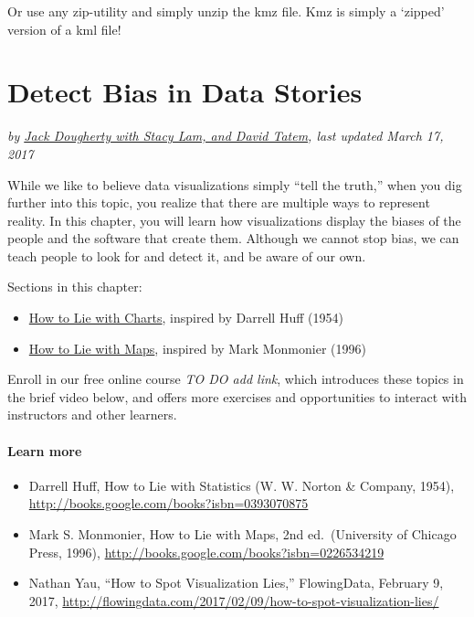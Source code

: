 \documentclass[
  english,
]{book}
\providecommand{\tightlist}{%
  \setlength{\itemsep}{0pt}\setlength{\parskip}{0pt}}
\begin{document}
Or use any zip-utility and simply unzip the kmz file. Kmz is simply a `zipped' version of a kml file!

\hypertarget{detect}{%
\chapter{Detect Bias in Data Stories}\label{detect}}

\emph{by \href{authors}{Jack Dougherty with Stacy Lam, and David Tatem}, last updated March 17, 2017}

While we like to believe data visualizations simply ``tell the truth,'' when you dig further into this topic, you realize that there are multiple ways to represent reality. In this chapter, you will learn how visualizations display the biases of the people and the software that create them. Although we cannot stop bias, we can teach people to look for and detect it, and be aware of our own.

Sections in this chapter:

\begin{itemize}
\tightlist
\item
  \href{how-to-lie-with-charts}{How to Lie with Charts}, inspired by Darrell Huff (1954)
\item
  \href{how-to-lie-with-maps}{How to Lie with Maps}, inspired by Mark Monmonier (1996)
\end{itemize}

Enroll in our free online course \emph{TO DO add link}, which introduces these topics in the brief video below, and offers more exercises and opportunities to interact with instructors and other learners.

\hypertarget{learn-more-19}{%
\subsubsection*{Learn more}\label{learn-more-19}}

\begin{itemize}
\tightlist
\item
  Darrell Huff, How to Lie with Statistics (W. W. Norton \& Company, 1954), \url{http://books.google.com/books?isbn=0393070875}
\item
  Mark S. Monmonier, How to Lie with Maps, 2nd ed.~(University of Chicago Press, 1996), \url{http://books.google.com/books?isbn=0226534219}
\item
  Nathan Yau, ``How to Spot Visualization Lies,'' FlowingData, February 9, 2017, \url{http://flowingdata.com/2017/02/09/how-to-spot-visualization-lies/}
\end{itemize}
\end{document}
